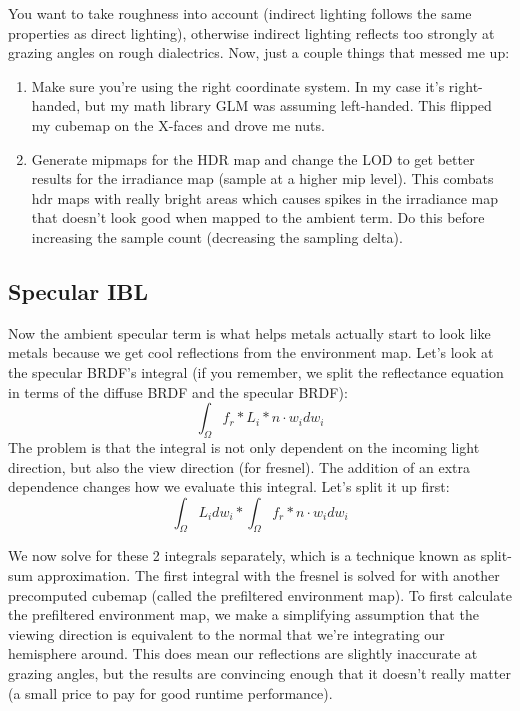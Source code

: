 \documentclass{article}
\begin{document}
You want to take roughness into account (indirect lighting follows the same properties
as direct lighting), otherwise indirect lighting reflects too strongly at grazing angles
on rough dialectrics. Now, just a couple things that messed me up:
\begin{enumerate}
  \item Make sure you're using the right coordinate system.
        In my case it's right-handed, but my math library GLM was
        assuming left-handed. This flipped my cubemap on the X-faces and drove me nuts.
  \item Generate mipmaps for the HDR map and change the LOD to get better results
        for the irradiance map (sample at a higher mip level). This combats
        hdr maps with really bright areas which causes spikes in the irradiance map
        that doesn't look good when mapped to the ambient term. Do this before 
        increasing the sample count (decreasing the sampling delta).
\end{enumerate}

\subsection{Specular IBL}

Now the ambient specular term is what helps metals actually start to look like metals
because we get cool reflections from the environment map. Let's look at the specular BRDF's 
integral (if you remember, we split the reflectance equation in terms of the diffuse BRDF and the specular BRDF):
\[\int_{\Omega} f_r * L_i * n\cdot w_i dw_i\]
The problem is that the integral is not only dependent on the incoming light direction,
but also the view direction (for fresnel). The addition of an extra dependence changes how we
evaluate this integral. Let's split it up first:
\[\int_{\Omega} L_i dw_i * \int_{\Omega} f_r * n\cdot w_i dw_i\]

We now solve for these 2 integrals separately, which is a technique known 
as split-sum approximation. The first integral with the fresnel is solved for 
with another precomputed cubemap (called the prefiltered environment map). To first 
calculate the prefiltered environment map, we make a simplifying assumption that the viewing direction is
equivalent to the normal that we're integrating our hemisphere around. This does mean our reflections are slightly inaccurate 
at grazing angles, but the results are convincing enough that it doesn't really matter (a small price to pay for good runtime performance).
\end{document}
